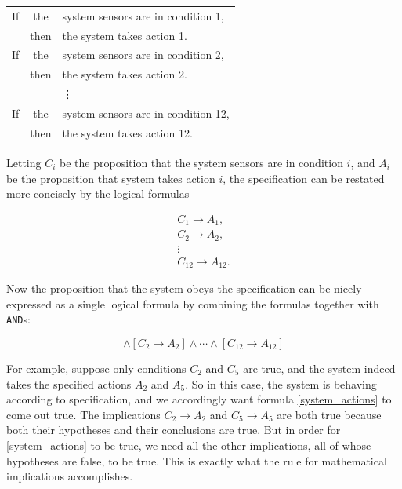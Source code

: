 \documentclass[11pt,oneside]{book}
\theoremstyle{definition}
\begin{document}
\begin{center}\begin{tabular}{rcl}
    If & the & system sensors are in condition 1, \\
    & then & the system takes action 1. \\
    If & the & system sensors are in condition 2, \\
    & then & the system takes action 2. \\
    && \vdots \\
    If & the & system sensors are in condition 12, \\
    & then & the system takes action 12.
\end{tabular}\end{center}

Letting $C_{i}$ be the proposition that the system sensors are in condition $i$, and $A_{i}$ be the proposition that system takes action $i$, the specification can be restated more concisely by the logical formulas

\[\begin{array}{c}
    C_{1} \rightarrow A_{1}, \\
    C_{2} \rightarrow A_{2}, \\
    \vdots \\
    C_{12} \rightarrow A_{12}.
\end{array}\]

Now the proposition that the system obeys the specification can be nicely expressed as a single logical formula by combining the formulas together with \texttt{AND}s:

\begin{equation}
    [C_{1} \rightarrow A_{1}] \land [C_{2} \rightarrow A_{2}] \land \cdots \land [C_{12} \rightarrow A_{12}] \label{system_actions}
\end{equation}

For example, suppose only conditions $C_{2}$ and $C_{5}$ are true, and the system indeed takes the specified actions $A_{2}$ and $A_{5}$.
So in this case, the system is behaving according to specification, and we accordingly want formula \eqref{system_actions} to come out true.
The implications $C_{2} \rightarrow A_{2}$ and $C_{5} \rightarrow A_{5}$ are both true because both their hypotheses and their conclusions are true. But in order for \eqref{system_actions} to be true, we need all the other implications, all of whose hypotheses are false, to be true.
This is exactly what the rule for mathematical implications accomplishes.
\end{document}

